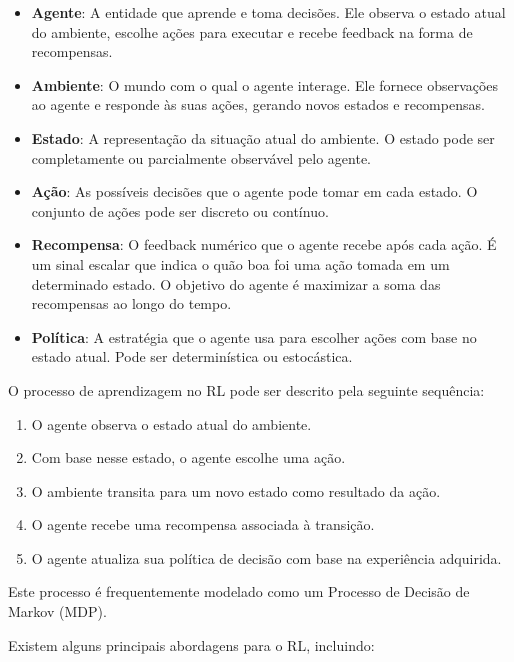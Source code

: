 \begin{itemize}
\item \textbf{Agente}: A entidade que aprende e toma decisões. Ele observa o estado atual do ambiente, escolhe ações para executar e recebe feedback na forma de recompensas.

\item \textbf{Ambiente}: O mundo com o qual o agente interage. Ele fornece observações ao agente e responde às suas ações, gerando novos estados e recompensas.

\item \textbf{Estado}: A representação da situação atual do ambiente. O estado pode ser completamente ou parcialmente observável pelo agente.

\item \textbf{Ação}: As possíveis decisões que o agente pode tomar em cada estado. O conjunto de ações pode ser discreto ou contínuo.

\item \textbf{Recompensa}: O feedback numérico que o agente recebe após cada ação. É um sinal escalar que indica o quão boa foi uma ação tomada em um determinado estado. O objetivo do agente é maximizar a soma das recompensas ao longo do tempo.

\item \textbf{Política}: A estratégia que o agente usa para escolher ações com base no estado atual. Pode ser determinística ou estocástica.
\end{itemize}

O processo de aprendizagem no RL pode ser descrito pela seguinte sequência:

\begin{enumerate}
\item O agente observa o estado atual do ambiente.
\item Com base nesse estado, o agente escolhe uma ação.
\item O ambiente transita para um novo estado como resultado da ação.
\item O agente recebe uma recompensa associada à transição.
\item O agente atualiza sua política de decisão com base na experiência adquirida.
\end{enumerate}

Este processo é frequentemente modelado como um Processo de Decisão de Markov (MDP).

Existem alguns principais abordagens para o RL, incluindo:

